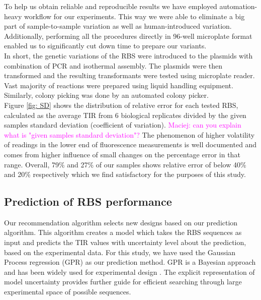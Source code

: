 \documentclass{article}
\newcommand{\mengyan}[1]{\textcolor{magenta}{#1}}
\begin{document}
To help us obtain reliable and reproducible results we have employed automation-heavy workflow for our experiments.
This way we were able to eliminate a big part of sample-to-sample variation as well as human-introduced variation.
Additionally, performing all the procedures directly in 96-well microplate format enabled us to significantly cut down time to prepare our variants.\\
In short, the genetic variations of the RBS were introduced to the plasmids with combination of PCR and isothermal assembly. 
The plasmids were then transformed and the resulting transformants were tested using microplate reader.
Vast majority of reactions were prepared using liquid handling equipment.
Similarly, colony picking was done by an automated colony picker.\\
Figure \ref{fig: SD} shows the distribution of relative error for each tested RBS, calculated as the average TIR from 6 biological replicates divided by the given samples standard deviation (coefficient of variation).
\mengyan{Maciej: can you explain what is "given samples standard deviation"?}
The phenomenon of higher volatility of readings in the lower end of fluorescence measurements is well documented and comes from higher influence of small changes on the percentage error in that range.
Overall, 79\% and 27\% of our samples shows relative error of below 40\% and 20\% respectively which we find satisfactory for the purposes of this study.

\subsection{Prediction of RBS performance}

Our recommendation algorithm selects new designs based on our prediction algorithm.
This algorithm creates a model which takes the RBS sequences as input and predicts the TIR values with uncertainty level about the prediction, based on the experimental data.
For this study, we have used the Gaussian Process regression (GPR) as our prediction method.
GPR is a Bayesian approach and has been widely used for experimental design \cite{srinivas2012information, romero_navigating_2013}.
The explicit representation of model uncertainty provides further guide for efficient searching through large experimental space of possible sequences.
\end{document}
